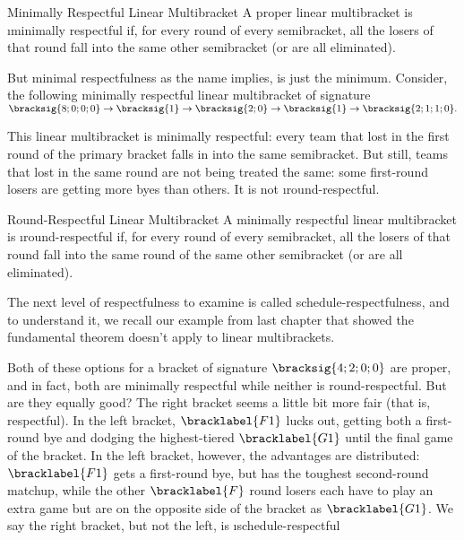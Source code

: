 {    \begin{definition}{Minimally Respectful Linear Multibracket}{}
        A proper linear multibracket is \i{minimally respectful} if, for every round of every semibracket, all the losers of that round fall into the same other semibracket (or are all eliminated).
    \end{definition}

    But minimal respectfulness as the name implies, is just the minimum. Consider, the following minimally respectful linear multibracket of signature $\bracksig{8;0;0;0} \to \bracksig{1}\to \bracksig{2;0} \to \bracksig{1} \to \bracksig{2;1;1;0}.$


    This linear multibracket is minimally respectful: every team that lost in the first round of the primary bracket falls in into the same semibracket. But still, teams that lost in the same round are not being treated the same: some first-round losers are getting more byes than others. It is not \i{round-respectful}.

    \begin{definition}{Round-Respectful Linear Multibracket}{}
        A minimally respectful linear multibracket is \i{round-respectful} if, for every round of every semibracket, all the losers of that round fall into the same round of the same other semibracket (or are all eliminated).
    \end{definition}

    The next level of respectfulness to examine is called schedule-respectfulness, and to understand it, we recall our example from last chapter that showed the fundamental theorem doesn't apply to linear multibrackets.


    Both of these options for a bracket of signature $\bracksig{4;2;0;0}$ are proper, and in fact, both are minimally respectful while neither is round-respectful. But are they equally good? The right bracket seems a little bit more fair (that is, respectful). In the left bracket, $\bracklabel{F1}$ lucks out, getting both a first-round bye and dodging the highest-tiered $\bracklabel{G1}$ until the final game of the bracket. In the left bracket, however, the advantages are distributed: $\bracklabel{F1}$ gets a first-round bye, but has the toughest second-round matchup, while the other $\bracklabel{F}$ round losers each have to play an extra game but are on the opposite side of the bracket as $\bracklabel{G1}$. We say the right bracket, but not the left, is \i{schedule-respectful}

}
